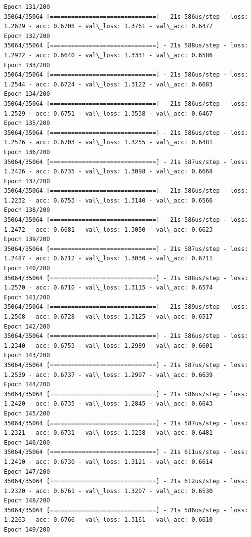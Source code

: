 \documentclass[11pt]{article}
\begin{document}
\begin{Verbatim}[commandchars=\\\{\}]
Epoch 131/200
35064/35064 [==============================] - 21s 586us/step - loss: 1.2629 - acc: 0.6708 - val\_loss: 1.3761 - val\_acc: 0.6477
Epoch 132/200
35064/35064 [==============================] - 21s 588us/step - loss: 1.2922 - acc: 0.6640 - val\_loss: 1.3331 - val\_acc: 0.6586
Epoch 133/200
35064/35064 [==============================] - 21s 586us/step - loss: 1.2544 - acc: 0.6724 - val\_loss: 1.3122 - val\_acc: 0.6683
Epoch 134/200
35064/35064 [==============================] - 21s 586us/step - loss: 1.2529 - acc: 0.6751 - val\_loss: 1.3538 - val\_acc: 0.6467
Epoch 135/200
35064/35064 [==============================] - 21s 586us/step - loss: 1.2526 - acc: 0.6703 - val\_loss: 1.3255 - val\_acc: 0.6481
Epoch 136/200
35064/35064 [==============================] - 21s 587us/step - loss: 1.2426 - acc: 0.6735 - val\_loss: 1.3098 - val\_acc: 0.6668
Epoch 137/200
35064/35064 [==============================] - 21s 586us/step - loss: 1.2232 - acc: 0.6753 - val\_loss: 1.3140 - val\_acc: 0.6566
Epoch 138/200
35064/35064 [==============================] - 21s 586us/step - loss: 1.2472 - acc: 0.6681 - val\_loss: 1.3050 - val\_acc: 0.6623
Epoch 139/200
35064/35064 [==============================] - 21s 587us/step - loss: 1.2487 - acc: 0.6712 - val\_loss: 1.3030 - val\_acc: 0.6711
Epoch 140/200
35064/35064 [==============================] - 21s 588us/step - loss: 1.2570 - acc: 0.6710 - val\_loss: 1.3115 - val\_acc: 0.6574
Epoch 141/200
35064/35064 [==============================] - 21s 589us/step - loss: 1.2508 - acc: 0.6728 - val\_loss: 1.3125 - val\_acc: 0.6517
Epoch 142/200
35064/35064 [==============================] - 21s 586us/step - loss: 1.2340 - acc: 0.6753 - val\_loss: 1.2989 - val\_acc: 0.6601
Epoch 143/200
35064/35064 [==============================] - 21s 587us/step - loss: 1.2539 - acc: 0.6737 - val\_loss: 1.2997 - val\_acc: 0.6639
Epoch 144/200
35064/35064 [==============================] - 21s 586us/step - loss: 1.2420 - acc: 0.6735 - val\_loss: 1.2845 - val\_acc: 0.6643
Epoch 145/200
35064/35064 [==============================] - 21s 587us/step - loss: 1.2321 - acc: 0.6731 - val\_loss: 1.3238 - val\_acc: 0.6481
Epoch 146/200
35064/35064 [==============================] - 21s 611us/step - loss: 1.2410 - acc: 0.6730 - val\_loss: 1.3121 - val\_acc: 0.6614
Epoch 147/200
35064/35064 [==============================] - 21s 612us/step - loss: 1.2320 - acc: 0.6761 - val\_loss: 1.3207 - val\_acc: 0.6530
Epoch 148/200
35064/35064 [==============================] - 21s 586us/step - loss: 1.2263 - acc: 0.6766 - val\_loss: 1.3161 - val\_acc: 0.6610
Epoch 149/200

\end{Verbatim}
\end{document}
